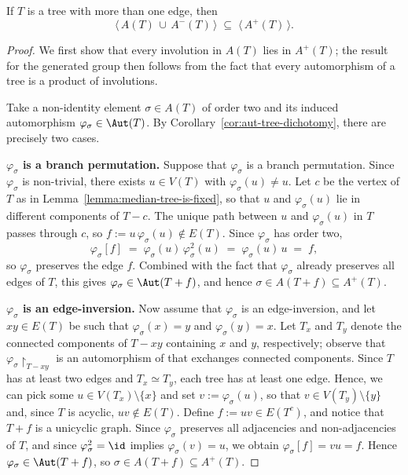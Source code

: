 \begin{proposition}\label{prop:tree-A-Aminus-in-Aplus}
    If $T$ is a tree with more than one edge, then
    $$
        \langle\,A(T)\,\cup\,A^-(T)\,\rangle\;\subseteq\;\langle\,A^+(T)\,\rangle.
    $$
\end{proposition}

\begin{proof}
    We first show that every involution in $A(T)$ lies in $A^+(T)$; the result for the generated group then follows from the fact that every automorphism of a tree is a product of involutions.

    Take a non-identity element $\sigma\in A(T)$ of order two and its induced automorphism $\varphi_\sigma\in\Aut(T)$.
    By Corollary~\ref{cor:aut-tree-dichotomy}, there are precisely two cases.

    \textbf{$\varphi_\sigma$ is a branch permutation.}
    Suppose that $\varphi_\sigma$ is a branch permutation.
    Since $\varphi_\sigma$ is non-trivial, there exists $u\in V(T)$ with $\varphi_\sigma(u)\neq u$.
    Let $c$ be the vertex of $T$ as in Lemma~\ref{lemma:median-tree-is-fixed}, so that $u$ and $\varphi_\sigma(u)$ lie in different components of $T-c$.
    The unique path between $u$ and $\varphi_\sigma(u)$ in $T$ passes through $c$, so $f:=u\,\varphi_\sigma(u)\notin E(T)$.
    Since $\varphi_\sigma$ has order two,
    $$
        \varphi_\sigma[f]\;=\;\varphi_\sigma(u)\,\varphi_\sigma^2(u)\;=\;\varphi_\sigma(u)\,u\;=\;f,
    $$
    so $\varphi_\sigma$ preserves the edge $f$.
    Combined with the fact that $\varphi_\sigma$ already preserves all edges of $T$, this gives $\varphi_\sigma\in\Aut(T+f)$, and hence $\sigma\in A(T+f)\subseteq A^+(T)$.

    \textbf{$\varphi_\sigma$ is an edge-inversion.}
    Now assume that $\varphi_\sigma$ is an edge-inversion, and let $xy\in E(T)$ be such that $\varphi_\sigma(x)=y$ and $\varphi_\sigma(y)=x$.
    Let $T_x$ and $T_y$ denote the connected components of $T-xy$ containing $x$ and $y$, respectively; observe that $\varphi_\sigma\restriction_{T-xy}$ is an automorphism of that exchanges connected components.
    Since $T$ has at least two edges and $T_x\simeq T_y$, each tree has at least one edge.
    Hence, we can pick some $u\in V(T_x)\setminus\{x\}$ and set $v:=\varphi_\sigma(u)$, so that $v\in V(T_y)\setminus\{y\}$ and, since $T$ is acyclic, $uv\notin E(T)$.
    Define $f:=uv\in E(T^c)$, and notice that $T+f$ is a unicyclic graph.
    Since $\varphi_\sigma$ preserves all adjacencies and non-adjacencies of $T$, and since $\varphi_\sigma^2=\id$ implies $\varphi_\sigma(v)=u$, we obtain $\varphi_\sigma[f]=vu=f$.
    Hence $\varphi_\sigma\in\Aut(T+f)$, so $\sigma\in A(T+f)\subseteq A^+(T)$.


\end{proof}

